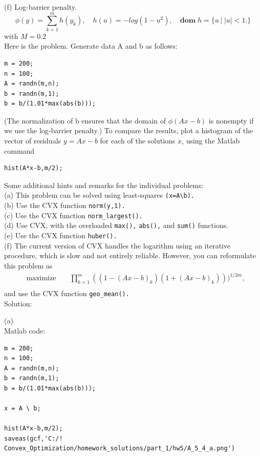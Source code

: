 \documentclass{article}
\begin{document}
(f) Log-barrier penalty. 
$$
\phi(y) = \sum_{k = 1}^m h(y_k), \quad 
h(u) = - log(1 - u^2), \quad
\boldsymbol{dom} \;h = \{u\,| \; |u| < 1.\}
$$
with $M = 0.2$
\\

Here is the problem. Generate data A and b as follows:

\begin{verbatim}
m = 200;
n = 100;
A = randn(m,n);
b = randn(m,1);
b = b/(1.01*max(abs(b)));
\end{verbatim}

(The normalization of b ensures that the domain of $\phi(Ax - b)$
is nonempty if we use the log-barrier penalty.) To compare the results, plot a histogram of the vector of residuals
$y = Ax - b$ for each
of the solutions $x$, using the Matlab command
\begin{verbatim}
hist(A*x-b,m/2);
\end{verbatim}

Some additional hints and remarks for the individual problems:\\
(a) This problem can be solved using least-squares \verb|(x=A\b).| \\
(b) Use the CVX function \verb|norm(y,1).|\\
(c) Use the CVX function \verb|norm_largest().| \\
(d) Use CVX, with the overloaded \verb|max(),| \verb|abs(),| and \verb|sum()|  functions.\\
(e) Use the CVX function \verb|huber().|\\
(f) The current version of CVX handles the logarithm using an iterative procedure, which is slow
and not entirely reliable. However, you can reformulate this problem as
\begin{align*}
&\text{maximize } && 
\prod_{k = 1}^m ((1 - (Ax - b)_k)(1 + (Ax - b)_k)))^{1 / 2m},  \\
\end{align*}
and use the CVX function \verb|geo_mean().| \\

Solution:

(a)\\
Matlab code:
\begin{verbatim}
m = 200;
n = 100;
A = randn(m,n);
b = randn(m,1);
b = b/(1.01*max(abs(b)));

x = A \ b;

hist(A*x-b,m/2);
saveas(gcf,'C:/! Convex_Optimization/homework_solutions/part_1/hw5/A_5_4_a.png')
\end{verbatim}
\end{document}
